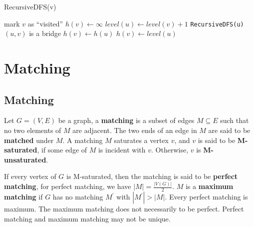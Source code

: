                     \begin{algorithm}[H]
                        \caption{RecursiveDFS(v)}
                        \begin{algorithmic}[1]
                            \State mark $v$ as ``visited''
                            \State $h(v) \gets \infty$
                                    \State $level(u) \gets level(v) + 1$
                                    \State \texttt{RecursiveDFS(u)}
                                        \State $(u, v)$ is a bridge
                                    \EndIf
                                        \State $h(v) \gets h(u)$
                                    \EndIf
                                \Else
                                        \State $h(v) \gets level(u)$
                                    \EndIf
                                \EndIf
                            \EndFor
                        \end{algorithmic}
                    \end{algorithm}

        \section{Matching}
            \subsection{Matching}
                \begin{definition}
                    Let $G = (V, E)$ be a graph, a \textbf{matching} is a subset of edges $M \subseteq E$ such that no two elements of $M$ are adjacent. The two ends of an edge in $M$ are said to be \textbf{matched} under $M$. A matching $M$ saturates a vertex $v$, and $v$ is said to be \textbf{M-saturated}, if some edge of $M$ is incident with $v$. Otherwise, $v$ is \textbf{M-unsaturated}.
                \end{definition}

                \begin{definition}
                    If every vertex of $G$ is M-saturated, then the matching is said to be \textbf{perfect matching}, for perfect matching, we have $|M| = \frac{|V(G)|}{2}$. $M$ is a \textbf{maximum matching} if $G$ has no matching $M^\prime$ with $|M^\prime| > |M|$. Every perfect matching is maximum. The maximum matching does not necessarily to be perfect. Perfect matching and maximum matching may not be unique.
                \end{definition}

